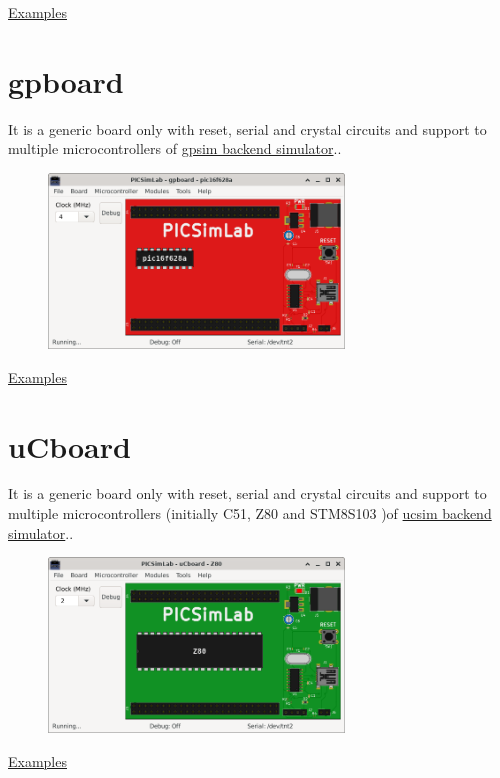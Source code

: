 \href{https://lcgamboa.github.io/picsimlab_examples/board_Xpress.html}{Examples}



\section{gpboard}

It is a generic board only with reset, serial and crystal circuits and support to multiple microcontrollers 
of \hyperlink{def:gpsim}{gpsim backend simulator}..

\begin{figure}[H]
\center
\includegraphics[width=0.7\textwidth]{img/gpboard.png} 
\end{figure} 

\href{https://lcgamboa.github.io/picsimlab_examples/board_gpboard.html}{Examples}


\section{uCboard}

It is a generic board only with reset, serial and crystal circuits and support to multiple microcontrollers 
(initially C51, Z80 and STM8S103 )of \hyperlink{def:ucsim}{ucsim backend simulator}..

\begin{figure}[H]
\center
\includegraphics[width=0.7\textwidth]{img/uCboard.png} 
\end{figure} 

\href{https://lcgamboa.github.io/picsimlab_examples/board_uCboard.html}{Examples}
